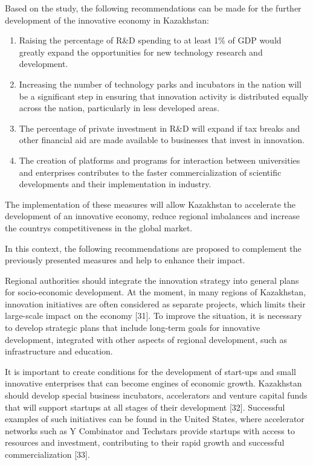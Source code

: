 \begin{multicols}{2}
Based on the study, the following recommendations can be made for the
further development of the innovative economy in Kazakhstan:

\begin{enumerate}
\def\labelenumi{\arabic{enumi}.}
\item
  Raising the percentage of R\&D spending to at least 1\% of GDP would
  greatly expand the opportunities for new technology research and
  development.
\item
  Increasing the number of technology parks and incubators in the nation
  will be a significant step in ensuring that innovation activity is
  distributed equally across the nation, particularly in less developed
  areas.
\item
  The percentage of private investment in R\&D will expand if tax breaks
  and other financial aid are made available to businesses that invest
  in innovation.
\item
  The creation of platforms and programs for interaction between
  universities and enterprises contributes to the faster
  commercialization of scientific developments and their implementation
  in industry.
\end{enumerate}

The implementation of these measures will allow Kazakhstan to accelerate
the development of an innovative economy, reduce regional imbalances and
increase the country\textquotesingle s competitiveness in the global
market.

In this context, the following recommendations are proposed to
complement the previously presented measures and help to enhance their
impact.

Regional authorities should integrate the innovation strategy into
general plans for socio-economic development. At the moment, in many
regions of Kazakhstan, innovation initiatives are often considered as
separate projects, which limits their large-scale impact on the economy
{[}31{]}. To improve the situation, it is necessary to develop strategic
plans that include long-term goals for innovative development,
integrated with other aspects of regional development, such as
infrastructure and education.

It is important to create conditions for the development of start-ups
and small innovative enterprises that can become engines of economic
growth. Kazakhstan should develop special business incubators,
accelerators and venture capital funds that will support startups at all
stages of their development {[}32{]}. Successful examples of such
initiatives can be found in the United States, where accelerator
networks such as Y Combinator and Techstars provide startups with access
to resources and investment, contributing to their rapid growth and
successful commercialization {[}33{]}.


\end{multicols}
